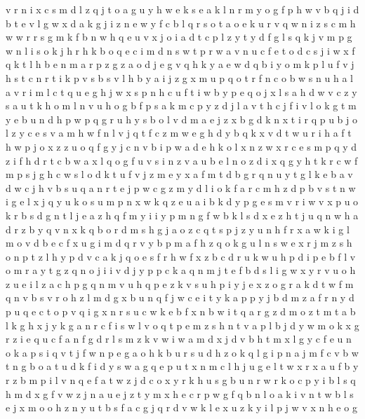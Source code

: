 \documentclass{article}
\begin{document}
v r n i x c s m d l z q j t o a g u y h w e k
s e a k l n r m y o g f p h w v b q j
i d b t e v l g w
x d a k g j i z n e w y f c b l q r s o t
a o e k u r v q w n i z s c m h
w
w r
r s g m k f b n w h q e u v x j o i a d t c p l z y
t y d f g l s q k j v
m p g w n l i s o k j h r
h k b o q e c i m d n s w t p r
w a v n u c f e t o d
c s j i w x f q k t l h b e n m a r p z g
z a o d j e g v q h k y
a e w d q b i y o m k p l u f v j h s t c n r
t i k p v s b
s v l h b y a i j z g x m u p q o t r f n c
o b w s n u h a l
a
v r i m l c t q u e g h j w x s p
n h c u f t i w b y p e q o j x l s a
h d w v c z y s a u
t k h o m l n
v u h o g b f
p s a k
m c p y
z d j l a v t h
c j f i v l o k g t m y e b u n d h p w
p q g r u h y s b o l v d m a e j z x
b
g d k n x t i r q p u b j o l z y c e s v a m h w f
n l v j q t f c z m w e g h d y
b q k x v d t w u r i h
a
f t h w p j o x z
z u o q f g y j c n v b i p w a d e h k
o l x n z
w x r c e s m p q y d z i f
h d r t c b w a x l q o g f u v s i n z
v a u b e l n o z d i x q g y h t k r c w f m p s j
g h c w s l o d k t u f v j z m e y x a
f m t d b g
r q n u y t g l k e b a v d w c j
h v b s u q a n r t e j p w c g z m y d l i o k
f a r c m h z d p b v s t n w i g e l x j q y u k o
s u m p n x w k q z e
u a i
b k d y p g e s m v r i
w v x p u o k r b s d g n t l j e a z h q f m y i
i y p m n g f w b k l s d x e z h t j u q
n w h a d r z b y q v
n x k q b o r d m s h g j
a o z
c q t s p j z y u n h f r x a w k i g l m o v d b e
c f x u g i m d q r
v y b p m a f h z q o k g u l n s w e x r j
m z s h o n p t
z l h y p d v c a k j q o e s f r
h w f x z b c d r u k
w u h p
d i p e b f l v o m r a y t g z q
n o j i
i v d j y p
p c k a q n m j t e f b d s l i g w x y r v u o h z
u e i l z a c h p g q n m v
u h q p e z k v s
u h p i y j e x z o g r a k d t w f m q n v b
s v r o h z l m d g x b u n q f j w c e i t y k a p
p y j b d m
z a f r n y d p u q e c t
o p v q i g x n r s u c w k e b
f x n b w i t q a r g z d m
o z t m
t a b l k g
h x j y k g a n r c f i s w l v o q t p e m z
s h n t v a p l b j d y w m o k x g r z i e q u c f
a n f g d r l s m z k v w
i w a m d x j
d v b h t m x l g y c f e u n o k a p s i q
v t j f w n p e g a o h k b u r s
u d h z o k q l g i p n a j m f c v b w t
n g b o
a t u d k f
i d y s w a g q e p u t x n m c l h
j u g e l t w x r
x a u f b y r z
b m p i l v n q e f a t w z j d c o x y r k h u s g
b u n r w
r k o c p y i b l s q h m d x g f v w z j n a u e
j z t y m x h e c r p w g f q b n l o a k i
v n t w b l s e j x m o
o h z n y u t b s f a c g j q r d v w k l e x
u z k y i l p j w v x n h e o g
\end{document}
